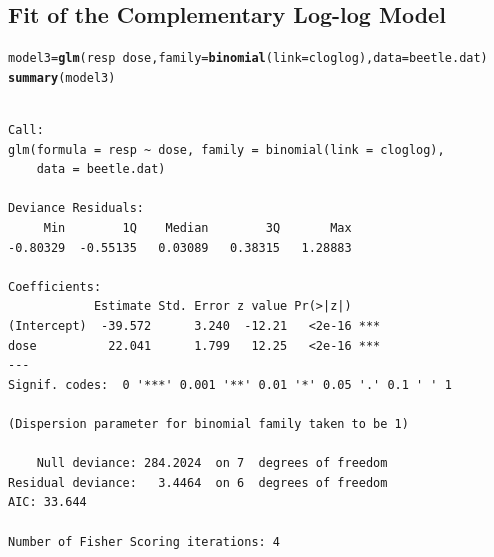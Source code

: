 \documentclass{article}\usepackage[]{graphicx}\usepackage[svgnames]{xcolor}
\makeatletter
\newcommand{\hlopt}[1]{\textcolor[rgb]{0,0,0}{#1}}%
\newcommand{\hlstd}[1]{\textcolor[rgb]{0.345,0.345,0.345}{#1}}%
\newcommand{\hlkwb}[1]{\textcolor[rgb]{0.69,0.353,0.396}{#1}}%
\newcommand{\hlkwc}[1]{\textcolor[rgb]{0.333,0.667,0.333}{#1}}%
\newcommand{\hlkwd}[1]{\textcolor[rgb]{0.737,0.353,0.396}{\textbf{#1}}}%
\newenvironment{kframe}{%
 \def\at@end@of@kframe{}%
 \ifinner\ifhmode%
  \def\at@end@of@kframe{\end{minipage}}%
  \begin{minipage}{\columnwidth}%
 \fi\fi%
 \def\FrameCommand##1{\hskip\@totalleftmargin \hskip-\fboxsep
 \colorbox{shadecolor}{##1}\hskip-\fboxsep
     \hskip-\linewidth \hskip-\@totalleftmargin \hskip\columnwidth}%
 \MakeFramed {\advance\hsize-\width
   \@totalleftmargin\z@ \linewidth\hsize
   \@setminipage}}%
 {\par\unskip\endMakeFramed%
 \at@end@of@kframe}
\newenvironment{knitrout}{}{} %
\makeatother
\begin{document}
\subsection*{Fit of the Complementary Log-log Model}
\begin{knitrout}
\color{fgcolor}\begin{kframe}
\begin{alltt}
\hlstd{model3} \hlkwb{=} \hlkwd{glm}\hlstd{(resp} \hlopt{~} \hlstd{dose,} \hlkwc{family} \hlstd{=} \hlkwd{binomial}\hlstd{(}\hlkwc{link} \hlstd{= cloglog),} \hlkwc{data} \hlstd{= beetle.dat)}
\hlkwd{summary}\hlstd{(model3)}
\end{alltt}
\begin{verbatim}

Call:
glm(formula = resp ~ dose, family = binomial(link = cloglog), 
    data = beetle.dat)

Deviance Residuals: 
     Min        1Q    Median        3Q       Max  
-0.80329  -0.55135   0.03089   0.38315   1.28883  

Coefficients:
            Estimate Std. Error z value Pr(>|z|)    
(Intercept)  -39.572      3.240  -12.21   <2e-16 ***
dose          22.041      1.799   12.25   <2e-16 ***
---
Signif. codes:  0 '***' 0.001 '**' 0.01 '*' 0.05 '.' 0.1 ' ' 1

(Dispersion parameter for binomial family taken to be 1)

    Null deviance: 284.2024  on 7  degrees of freedom
Residual deviance:   3.4464  on 6  degrees of freedom
AIC: 33.644

Number of Fisher Scoring iterations: 4
\end{verbatim}
\end{kframe}
\end{knitrout}
\end{document}
